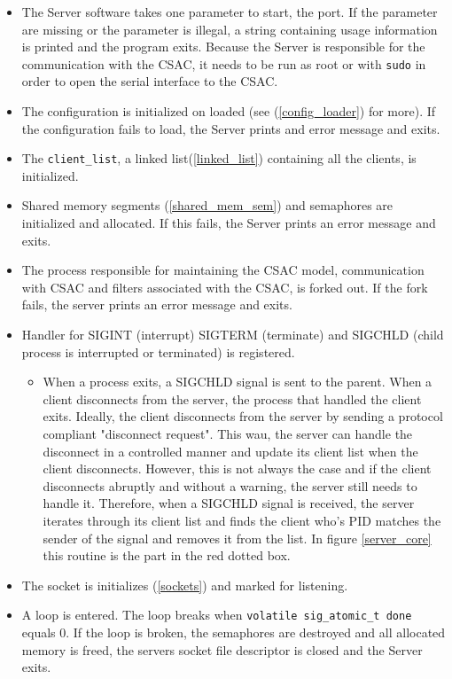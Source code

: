 \documentclass[12pt,english,a4paper]{report}
\begin{document}
\begin{itemize} %
  \item The Server software takes one parameter to start, the port. If the parameter are missing or the parameter is illegal, a string containing usage information is printed and the program exits. Because the Server is responsible for the communication with the CSAC, it needs to be run as root or with \texttt{sudo} in order to open the serial interface to the CSAC.
  \item The configuration is initialized on loaded (see (\ref{config_loader}) for more). If the configuration fails to load, the Server prints and error message and exits.
  \item The \texttt{client\_list}, a linked list(\ref{linked_list}) containing all the clients, is initialized.
  \item Shared memory segments (\ref{shared_mem_sem}) and semaphores are initialized and allocated. If this fails, the Server prints an error message and exits.
  \item The process responsible for maintaining the CSAC model, communication with CSAC and filters associated with the CSAC, is forked out. If the fork fails, the server prints an error message and exits.
  \item Handler for SIGINT (interrupt) SIGTERM (terminate) and SIGCHLD (child process is interrupted or terminated) is registered.
  \begin{itemize}
      \item When a process exits, a SIGCHLD signal is sent to the parent. When a client disconnects from the server, the process that handled the client exits. Ideally, the client disconnects from the server by sending a protocol compliant "disconnect request". This wau, the server can handle the disconnect in a controlled manner and update its client list when the client disconnects. However, this is not always the case and if the client disconnects abruptly and without a warning, the server still needs to handle it. Therefore, when a SIGCHLD signal is received, the server iterates through its client list and finds the client who's PID matches the sender of the signal and removes it from the list. In figure \ref{server_core} this routine is the part in the red dotted box. 
  \end{itemize}
  \item The socket is initializes (\ref{sockets}) and marked for listening.
  \item A loop is entered. The loop breaks when \texttt{volatile sig\_atomic\_t done}\label{atomic_done} equals 0. If the loop is broken, the semaphores are destroyed and all allocated memory is freed, the servers socket file descriptor is closed and the Server exits.

\end{itemize}
\end{document}
